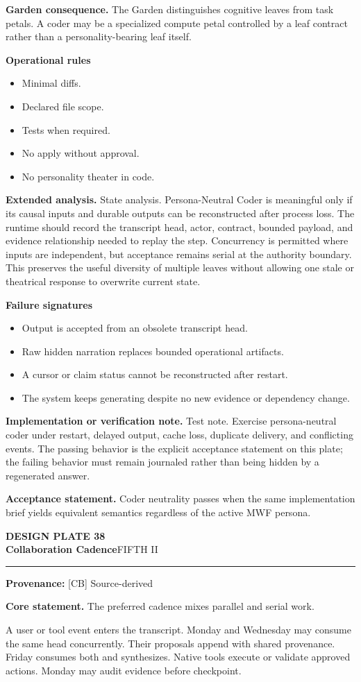 \documentclass[10pt,letterpaper,oneside]{article}
\newcommand{\prov}[1]{\textcolor{gardenBlue}{\sffamily\footnotesize\textbf{Provenance:} #1}}
\newcommand{\platetitle}[3]{%
  \begin{minipage}[t][0.54in][t]{\textwidth}
  {\sffamily\bfseries\color{gardenDeep}\fontsize{9}{10}\selectfont DESIGN PLATE #1}\\[-1pt]
  {\sffamily\bfseries\color{gardenInk}\fontsize{16.5}{18}\selectfont #2}\hfill{\sffamily\color{gardenGreen}\large #3}
  \end{minipage}\vspace{-2pt}\hrule\vspace{5pt}}
\begin{document}
\textbf{Garden consequence.} The Garden distinguishes cognitive leaves from task petals. A coder may be a specialized compute petal controlled by a leaf contract rather than a personality-bearing leaf itself.

\textbf{Operational rules}
\begin{itemize}
\item Minimal diffs.
\item Declared file scope.
\item Tests when required.
\item No apply without approval.
\item No personality theater in code.
\end{itemize}
\textbf{Extended analysis.} State analysis. Persona-Neutral Coder is meaningful only if its causal inputs and durable outputs can be reconstructed after process loss. The runtime should record the transcript head, actor, contract, bounded payload, and evidence relationship needed to replay the step. Concurrency is permitted where inputs are independent, but acceptance remains serial at the authority boundary. This preserves the useful diversity of multiple leaves without allowing one stale or theatrical response to overwrite current state.

\textbf{Failure signatures}
\begin{itemize}
\item Output is accepted from an obsolete transcript head.
\item Raw hidden narration replaces bounded operational artifacts.
\item A cursor or claim status cannot be reconstructed after restart.
\item The system keeps generating despite no new evidence or dependency change.
\end{itemize}
\textbf{Implementation or verification note.} Test note. Exercise persona-neutral coder under restart, delayed output, cache loss, duplicate delivery, and conflicting events. The passing behavior is the explicit acceptance statement on this plate; the failing behavior must remain journaled rather than being hidden by a regenerated answer.

\begin{acceptbox}
\textbf{Acceptance statement.} Coder neutrality passes when the same implementation brief yields equivalent semantics regardless of the active MWF persona.
\end{acceptbox}
\newpage
\platetitle{38}{Collaboration Cadence}{FIFTH II}
\prov{[CB] Source-derived}
\fontsize{8.85}{10.45}\selectfont
\begin{corebox}
\textbf{Core statement.} The preferred cadence mixes parallel and serial work.
\end{corebox}
A user or tool event enters the transcript. Monday and Wednesday may consume the same head concurrently. Their proposals append with shared provenance. Friday consumes both and synthesizes. Native tools execute or validate approved actions. Monday may audit evidence before checkpoint.
\end{document}

